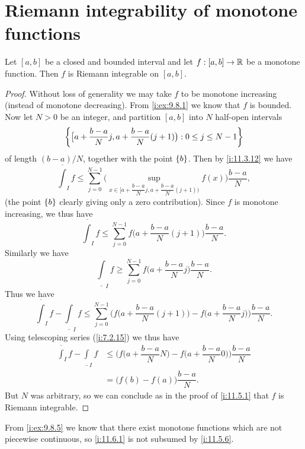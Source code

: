 \section{Riemann integrability of monotone functions}\label{i:sec:11.6}

\begin{prop}\label{i:11.6.1}
  Let \([a, b]\) be a closed and bounded interval and let \(f : [a, b] \to \mathbb{R}\) be a monotone function.
  Then \(f\) is Riemann integrable on \([a, b]\).
\end{prop}

\begin{proof}
  Without loss of generality we may take \(f\) to be monotone increasing (instead of monotone decreasing).
  From \cref{i:ex:9.8.1} we know that \(f\) is bounded.
  Now let \(N > 0\) be an integer, and partition \([a, b]\) into \(N\) half-open intervals
  \[
    \left\lbrace\big[a + \dfrac{b - a}{N} j, a + \dfrac{b - a}{N} (j + 1)\big) : 0 \leq j \leq N - 1\right\rbrace
  \]
  of length \((b - a) / N\), together with the point \(\left\lbrace b\right\rbrace\).
  Then by \cref{i:11.3.12} we have
  \[
    \overline{\int}_I f \leq \sum_{j = 0}^{N - 1} \Bigg(\sup_{x \in \big[a + \dfrac{b - a}{N} j, a + \dfrac{b - a}{N} (j + 1)\big)} f(x)\Bigg) \dfrac{b - a}{N},
  \]
  (the point \(\left\lbrace b\right\rbrace\) clearly giving only a zero contribution).
  Since \(f\) is monotone increasing, we thus have
  \[
    \overline{\int}_I f \leq \sum_{j = 0}^{N - 1} f\bigg(a + \dfrac{b - a}{N} (j + 1)\bigg) \dfrac{b - a}{N}.
  \]
  Similarly we have
  \[
    \underline{\int}_I f \geq \sum_{j = 0}^{N - 1} f\bigg(a + \dfrac{b - a}{N} j\bigg) \dfrac{b - a}{N}.
  \]
  Thus we have
  \[
    \overline{\int}_I f - \underline{\int}_I f \leq \sum_{j = 0}^{N - 1} \Bigg(f\bigg(a + \dfrac{b - a}{N} (j + 1)\bigg) - f\bigg(a + \dfrac{b - a}{N} j\bigg)\Bigg) \dfrac{b - a}{N}.
  \]
  Using telescoping series (\cref{i:7.2.15}) we thus have
  \begin{align*}
    \overline{\int}_I f - \underline{\int}_I f & \leq \Bigg(f\bigg(a + \dfrac{b - a}{N} N\bigg) - f\bigg(a + \dfrac{b - a}{N} 0\bigg)\Bigg) \dfrac{b - a}{N} \\
                                               & = \big(f(b) - f(a)\big) \dfrac{b - a}{N}.
  \end{align*}
  But \(N\) was arbitrary, so we can conclude as in the proof of \cref{i:11.5.1} that \(f\) is Riemann integrable.
\end{proof}

\begin{rmk}\label{i:11.6.2}
  From \cref{i:ex:9.8.5} we know that there exist monotone functions which are not piecewise continuous, so \cref{i:11.6.1} is not subsumed by \cref{i:11.5.6}.
\end{rmk}

